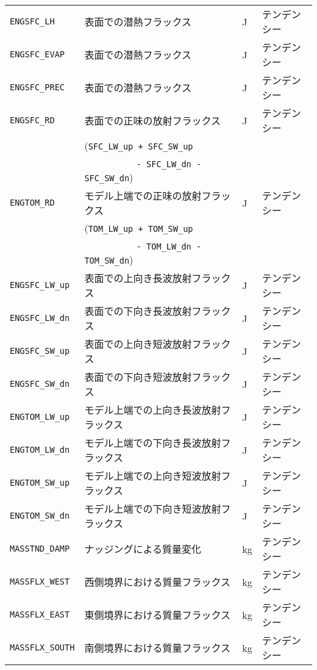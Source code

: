 \begin{longtable}{|l|l|l|l|}
      \verb|ENGSFC_LH|    & 表面での潜熱フラックス                & J & テンデンシー \\
      \verb|ENGSFC_EVAP|  & 表面での潜熱フラックス                & J & テンデンシー \\
      \verb|ENGSFC_PREC|  & 表面での潜熱フラックス                & J & テンデンシー \\
      \verb|ENGSFC_RD|    & 表面での正味の放射フラックス          & J & テンデンシー \\
                          & (\verb|SFC_LW_up + SFC_SW_up|         & & \\
                          & ~~~~~~~~~~ \verb|- SFC_LW_dn - SFC_SW_dn|)  & & \\
      \verb|ENGTOM_RD|    & モデル上端での正味の放射フラックス    & J & テンデンシー \\
                          & (\verb|TOM_LW_up + TOM_SW_up|         & & \\
                          & ~~~~~~~~~~ \verb|- TOM_LW_dn - TOM_SW_dn|)  & & \\
      \verb|ENGSFC_LW_up| & 表面での上向き長波放射フラックス      & J & テンデンシー \\
      \verb|ENGSFC_LW_dn| & 表面での下向き長波放射フラックス      & J & テンデンシー \\
      \verb|ENGSFC_SW_up| & 表面での上向き短波放射フラックス      & J & テンデンシー \\
      \verb|ENGSFC_SW_dn| & 表面での下向き短波放射フラックス      & J & テンデンシー \\
      \verb|ENGTOM_LW_up| & モデル上端での上向き長波放射フラックス & J & テンデンシー \\
      \verb|ENGTOM_LW_dn| & モデル上端での下向き長波放射フラックス & J & テンデンシー \\
      \verb|ENGTOM_SW_up| & モデル上端での上向き短波放射フラックス & J & テンデンシー \\
      \verb|ENGTOM_SW_dn| & モデル上端での下向き短波放射フラックス & J & テンデンシー \\
      \verb|MASSTND_DAMP|  & ナッジングによる質量変化                 & kg & テンデンシー \\
      \verb|MASSFLX_WEST|  & 西側境界における質量フラックス           & kg & テンデンシー \\
      \verb|MASSFLX_EAST|  & 東側境界における質量フラックス           & kg & テンデンシー \\
      \verb|MASSFLX_SOUTH| & 南側境界における質量フラックス           & kg & テンデンシー \\

\end{longtable}

